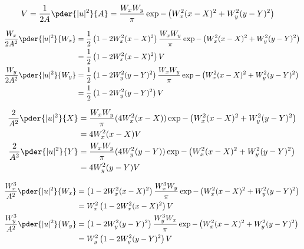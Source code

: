 \begin{equation}
\begin{split}
V = \frac{1}{2A}\pder{|u|^2}{A}  &= \frac{W_x W_y}{\pi} \exp{-\left( W_x^2(x-X)^2 + W_y^2(y-Y)^2 \right)}
\end{split}
\end{equation}

\begin{equation}
\begin{split}
\frac{W_{x}}{2A^2} \pder{|u|^2}{W_{x}} &= \frac{1}{2}\left(1  - 2 W_{x}^2 (x-X)^2  \right) \frac{W_{x} W_y}{\pi}\exp{-\left( W_x^2(x-X)^2 + W_y^2(y-Y)^2 \right)} \\
&= \frac{1}{2}\left(1  - 2 W_{x}^2 (x-X)^2  \right) V \\
\frac{W_{y}}{2A^2} \pder{|u|^2}{W_{y}} &= \frac{1}{2} \left(1  - 2 W_{y}^2 (y-Y)^2  \right) \frac{W_{x} W_y}{\pi}\exp{-\left( W_x^2(x-X)^2 + W_y^2(y-Y)^2 \right)}\\
&= \frac{1}{2} \left(1  - 2 W_{y}^2 (y-Y)^2  \right)  V \\
\end{split}
\end{equation}


\begin{equation}
\begin{split}
\frac{2}{A^2} \pder{|u|^2}{X}  &= \frac{W_x W_y}{\pi} (4W_x^2(x-X)) \exp{-\left( W_x^2(x-X)^2 + W_y^2(y-Y)^2 
\right)}\\
&=  4 W_x^2(x-X) V\\
\frac{2}{A^2} \pder{|u|^2}{Y}  &= \frac{W_x W_y}{\pi} (4W_y^2(y-Y)) \exp{-\left( W_x^2(x-X)^2 + W_y^2(y-Y)^2 \right)} \\
&=  4 W_y^2(y-Y) V\\
\end{split}
\end{equation}

\begin{equation}
\begin{split}
\frac{W_{x}^3}{A^2}\pder{|u|^2}{W_{x}} &= \left(1  - 2 W_{x}^2 (x-X)^2  \right) \frac{W_{x}^3 W_y}{\pi}\exp{-\left( W_x^2(x-X)^2 + W_y^2(y-Y)^2 \right)}\\
&= W_{x}^2 \left(1  - 2 W_{x}^2 (x-X)^2  \right) V \\
\frac{W_{y}^3}{A^2}\pder{|u|^2}{W_{y}} &= \left(1  - 2 W_{y}^2 (y-Y)^2  \right) \frac{W_{y}^3 W_x}{\pi}\exp{-\left( W_x^2(x-X)^2 + W_y^2(y-Y)^2 \right)}\\
&= W_{y}^2 \left(1  - 2 W_{y}^2 (y-Y)^2  \right) V \\
\end{split}
\end{equation}



